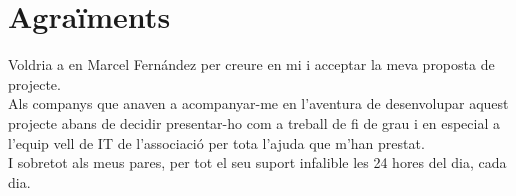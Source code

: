 \chapter*{Agraïments}

Voldria a en Marcel Fernández per creure en mi i acceptar la meva proposta de projecte.
\\

Als companys que anaven a acompanyar-me en l'aventura de desenvolupar aquest projecte abans de decidir presentar-ho com a treball de fi de grau i en especial a l'equip vell de IT de l'associació per tota l'ajuda que m'han prestat.
\\

I sobretot als meus pares, per tot el seu suport infalible les 24 hores del dia, cada dia.
